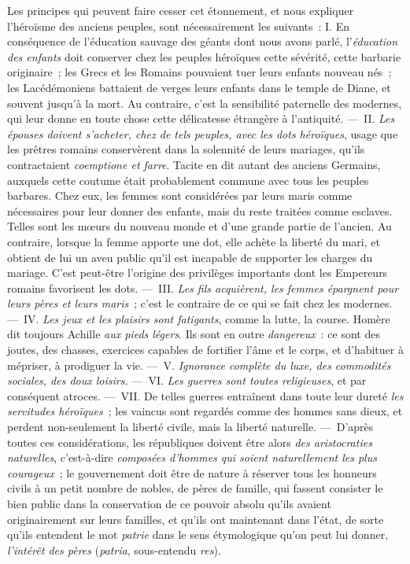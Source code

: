 \documentclass[french,twoside]{book} %
\begin{document}
Les principes qui peuvent faire cesser cet étonnement, et nous expliquer l’héroïsme des anciens peuples, sont nécessairement les suivants : I. En conséquence de l’éducation sauvage des géants dont nous avons parlé, l’{\itshape éducation des enfants} doit conserver chez les peuples héroïques cette sévérité, cette barbarie originaire ; les Grecs et les Romains pouvaient tuer leurs enfants nouveau nés ; les Lacédémoniens battaient de verges leurs enfants dans le temple de Diane, et souvent jusqu’à la mort. Au contraire, c’est la sensibilité paternelle des modernes, qui leur donne en toute chose cette délicatesse étrangère à l’antiquité. — II. {\itshape Les épouses doivent s’acheter, chez de tels peuples, avec les dots héroïques}, usage que les prêtres romains conservèrent dans la solennité de leurs mariages, qu’ils contractaient {\itshape coemptione et farre}. Tacite en dit autant des anciens Germains, auxquels cette coutume était probablement commune avec tous les peuples barbares. Chez eux, les femmes sont considérées par leurs maris comme nécessaires pour leur donner des enfants, mais du reste traitées comme esclaves. Telles sont les mœurs du nouveau monde et d’une grande partie de l’ancien. Au contraire, lorsque la femme apporte une dot, elle achète la liberté du mari, et obtient de lui un aveu public qu’il est incapable de supporter les charges du mariage. C’est peut-être l’origine des privilèges importants dont les Empereurs  romains favorisent les dots. — III. {\itshape Les fils acquièrent, les femmes épargnent pour leurs pères et leurs maris} ; c’est le contraire de ce qui se fait chez les modernes. — IV. {\itshape Les jeux et les plaisirs sont fatigants}, comme la lutte, la course. Homère dit toujours Achille \emph{{\itshape aux pieds légers}}. Ils sont en outre {\itshape dangereux} : ce sont des joutes, des chasses, exercices capables de fortifier l’âme et le corps, et d’habituer à mépriser, à prodiguer la vie. — V. {\itshape Ignorance complète du luxe, des commodités sociales, des doux loisirs.} — VI. {\itshape Les guerres sont toutes religieuses}, et par conséquent atroces. — VII. De telles guerres entraînent dans toute leur dureté {\itshape les servitudes héroïques} ; les vaincus sont regardés comme des hommes sans dieux, et perdent non-seulement la liberté civile, mais la liberté naturelle. — D’après toutes ces considérations, les républiques doivent être alors {\itshape des aristocraties naturelles}, c’est-à-dire {\itshape composées d’hommes qui soient naturellement les plus courageux} ; le gouvernement doit être de nature à réserver tous les honneurs civils à un petit nombre de nobles, de pères de famille, qui fassent consister le bien public dans la conservation de ce pouvoir absolu qu’ils avaient originairement sur leurs familles, et qu’ils ont maintenant dans l’état, de sorte qu’ils entendent le mot {\itshape patrie} dans le sens étymologique qu’on peut lui donner, {\itshape l’intérêt des pères} ({\itshape patria}, sous-entendu {\itshape res}).\par
\end{document}
